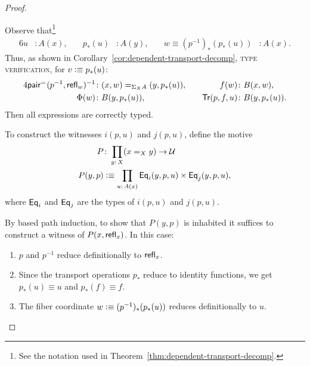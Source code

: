 \begin{proof}${}$
    \begin{description}[font=\normalfont\scshape]
        \item[Type verification:] 
        Observe that\footnote{See the notation used in Theorem~\ref{thm:dependent-transport-decomp}.}
        \begin{alignat*}6
            u&\colon A(x),&\quad p_*(u)&\colon A(y),
                &\quad w\equiv(p^{-1})_*(p_*(u))&\colon A(x).
        \end{alignat*}
        Thus, as shown in Corollary~\ref{cor:dependent-transport-decomp}, \textsc{type verification}, for $v\mathrel{\vcentcolon}\equiv p_*(u)$:
        \begin{alignat*}4
            \fun{pair}^{\eq{}}(p^{-1},\fun{refl}_w)^{-1}
                    &\colon(x,w)\eq{\Sigma_XA}(y,p_*(u)),
                    &\quad f(w)&\colon B(x,w),\\
            \Phi(w)&\colon B(y,p_*(u)),
                &\quad\fun{Tr}(p,f,u)&\colon B(y,p_*(u)).
        \end{alignat*}
        Then all expressions are correctly typed.

        \item[Inhabitation:] To construct the witnesses $i(p,u)$ and $j(p,u)$, define the motive
        \begin{align*}
            P&\colon\prod_{y\colon X}(x\eq Xy)\to\univ\\
            P(y,p)&\defeq\prod_{u\colon A(x)}
                \fun{Eq}_i(y,p,u)\times\fun{Eq}_j(y,p,u),
        \end{align*}
        where $\mathsf{Eq}_i$ and $\mathsf{Eq}_j$ are the types of $i(p,u)$ and $j(p,u)$.
    
        By based path induction, to show that $P(y,p)$ is inhabited it suffices to construct a witness of $P(x,\mathsf{refl}_x)$. In this case:
        \begin{enumerate}[-]
            \item $p$ and $p^{-1}$ reduce definitionally to $\mathsf{refl}_x$.
            
            \item Since the transport operations $p_*$ reduce to identity functions, we get $p_*(u)\equiv u$ and $p_*(f)\equiv f$.
            
            \item The fiber coordinate $w\mathrel{\vcentcolon}\equiv(p^{-1})_*(p_*(u))$ reduces definitionally to $u$.
            

\end{enumerate}
\end{description}
\end{proof}
